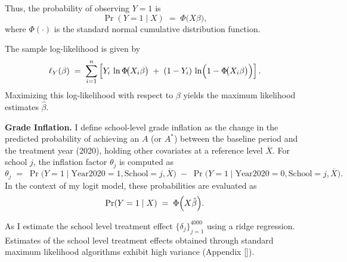 Thus, the probability of observing \(Y=1\) is
\[
\Pr(Y=1 \mid X) \;=\; \Phi\bigl(X\beta\bigr),
\]
where \(\Phi(\cdot)\) is the standard normal cumulative distribution function.

The sample log-likelihood is given by
\[
\ell_Y(\beta)
\;=\;
\sum_{i=1}^n \left[
Y_{i}\,\ln \Phi\!\bigl(X_i\beta\bigr)
\;+\;
(1-Y_{i})\,\ln \Bigl(1-\Phi\!\bigl(X_i\beta\bigr)\Bigr)
\right].
\]
Maximizing this log-likelihood with respect to \(\beta\) yields the maximum likelihood estimates \(\hat{\beta}\).

\bigskip
\noindent
\textbf{Grade Inflation.} I define school-level grade inflation as the change in the predicted probability of achieving an \(A\) (or \(A^*\)) between the baseline period and the treatment year (2020), holding other covariates at a reference level \(\overline{X}\). For school \(j\), the inflation factor \(\theta_j\) is computed as
\[
\theta_j \;=\;
\Pr\bigl(Y=1 \mid \text{Year2020}=1,\text{School}=j,\overline{X}\bigr)
\;-\;
\Pr\bigl(Y=1 \mid \text{Year2020}=0,\text{School}=j,\overline{X}\bigr).
\]
In the context of my logit model, these probabilities are evaluated as
\[
\Pr(Y=1 \mid X) \;=\; \Phi\Bigl( X\hat{\beta} \Bigr).
\]

As I estimate the school level treatment effect $\{\delta_j\}_{j=1}^{4000}$ using a ridge regression. Estimates of the school level treatment effects obtained through standard maximum likelihood algorithms exhibit high variance (Appendix []). 
